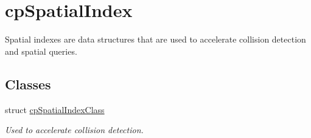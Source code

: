 \hypertarget{group__cp_spatial_index}{}\section{cp\+Spatial\+Index}
\label{group__cp_spatial_index}


Spatial indexes are data structures that are used to accelerate collision detection and spatial queries.  


\subsection*{Classes}
\begin{DoxyCompactItemize}
\item 
struct \hyperlink{structcp_spatial_index_class}{cp\+Spatial\+Index\+Class}
\begin{DoxyCompactList}\small\item\em Used to accelerate collision detection. \end{DoxyCompactList}\end{DoxyCompactItemize}
